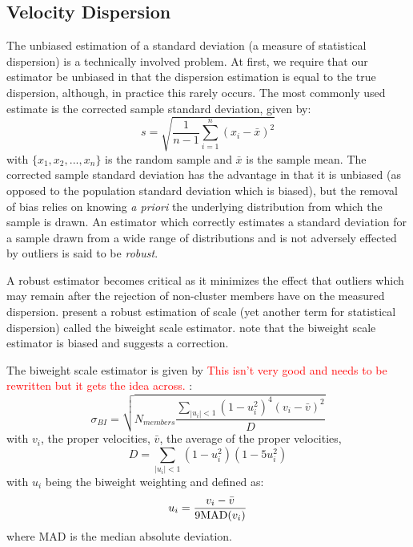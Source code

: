 \documentclass[apj, revtex4]{emulateapj}
\newcommand{\editorial}[1]{\textcolor{red}{#1} }
\begin{document}
\subsection{Velocity Dispersion}
The unbiased estimation of a standard deviation (a measure of statistical dispersion) is a technically involved problem. At first, we require that our estimator be unbiased in that the dispersion estimation is equal to the true dispersion, although, in practice this rarely occurs. The most commonly used estimate is the corrected sample standard deviation, given by:
\begin{equation}
	s = \sqrt{\frac{1}{n-1} \sum_{i=1}^n (x_i - \bar{x})^2}
\end{equation}
with $\{x_1, x_2, ..., x_n\}$ is the random sample and $\bar{x}$ is the sample mean. The corrected sample standard deviation has the advantage in that it is unbiased (as opposed to the population standard deviation which is biased), but the removal of bias relies on knowing \textit{a priori} the underlying distribution from which the sample is drawn. An estimator which correctly estimates a standard deviation for a sample drawn from a wide range of distributions and is not adversely effected by outliers is said to be \textit{robust}.

A robust estimator becomes critical as it minimizes the effect that outliers which may remain after the rejection of non-cluster members have on the measured dispersion. \cite{Beers1990} present a robust estimation of scale (yet another term for statistical dispersion) called the biweight scale estimator. \cite{Ruel2014} note that the biweight scale estimator is biased and suggests a correction. 

The biweight scale estimator is given by \editorial{This isn't very good and needs to be rewritten but it gets the idea across.}:
\begin{equation}
	\sigma_{BI} = \sqrt{ N_{members} \frac{ \sum_{|u_i|<1} (1-u_i^2)^4 (v_i - \bar{v})^2} {D} }
\end{equation}
with $v_i$, the proper velocities, $\bar{v}$, the average of the proper velocities,
\begin{equation}
	D = \sum_{|u_i|<1} (1-u_i^2)(1-5u_i^2)
\end{equation}
with $u_i$ being the biweight weighting and defined as:
\begin{equation}
	u_i = \frac{v_i - \bar{v}}{9 {\rm MAD}(v_i)}
\end{equation}
where MAD is the median absolute deviation.
\end{document}
